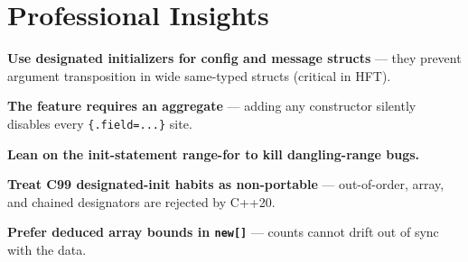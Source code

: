 \section{Professional Insights}
\label{sec:c20-designated-insights}

\textbf{Use designated initializers for config and message structs} --- they prevent argument transposition in wide same-typed structs (critical in HFT).

\textbf{The feature requires an aggregate} --- adding any constructor silently disables every \texttt{\{.field=...\}} site.

\textbf{Lean on the init-statement range-for to kill dangling-range bugs.}

\textbf{Treat C99 designated-init habits as non-portable} --- out-of-order, array, and chained designators are rejected by C++20.

\textbf{Prefer deduced array bounds in \texttt{new[]}} --- counts cannot drift out of sync with the data.
